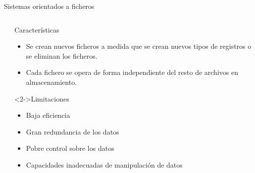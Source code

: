 \begin{frame}{Sistemas orientados a ficheros}
\begin{columns}[T]
\begin{column}{0.30\linewidth}
    \end{column}

    


        \begin{column}{0.68\linewidth}
            \begin{block}{Caracter\'isticas}
                \begin{itemize}
                    \item Se crean nuevos ficheros a medida que se crean nuevos tipos de registros o se eliminan los ficheros.
                    \item Cada fichero se opera de forma independiente del resto de archivos en almacenamiento.
                \end{itemize}
                 
            \end{block}
            \begin{alertblock}<2->{Limitaciones}
                \begin{itemize}
                    \item<2-> Baja eficiencia
                    \item<3-> Gran redundancia de los datos
                    \item<4-> Pobre control sobre los datos
                    \item<5-> Capacidades inadecuadas de manipulaci\'on de datos
                \end{itemize}
            \end{alertblock}
        \end{column}

    \end{columns}







\end{frame}